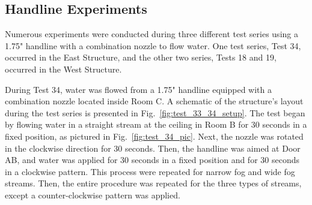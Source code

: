 \documentclass[12pt,oneside]{book}
\begin{document}
\clearpage

\subsection{Handline Experiments}
\label{subsec:handline_procedure}
Numerous experiments were conducted during three different test series using a 1.75" handline with a combination nozzle to flow water. One test series, Test 34, occurred in the East Structure, and the other two series, Tests 18 and 19, occurred in the West Structure. 

During Test 34, water was flowed from a 1.75" handline equipped with a combination nozzle located inside Room C. A schematic of the structure's layout during the test series is presented in Fig.~\ref{fig:test_33_34_setup}. The test began by flowing water in a straight stream at the ceiling in Room B for 30 seconds in a fixed position, as pictured in Fig.~\ref{fig:test_34_pic}. Next, the nozzle was rotated in the clockwise direction for 30 seconds. Then, the handline was aimed at Door AB, and water was applied for 30 seconds in a fixed position and for 30 seconds in a clockwise pattern. This process were repeated for narrow fog and wide fog streams. Then, the entire procedure was repeated for the three types of streams, except a counter-clockwise pattern was applied.
\end{document}
